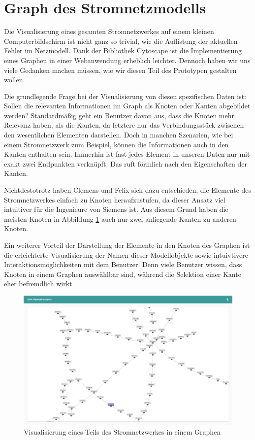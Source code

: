 \section{Graph des Stromnetzmodells}

Die Visualisierung eines gesamten Stromnetzwerkes auf einem kleinen Computerbildschirm ist nicht ganz so trivial, wie die Auflistung der aktuellen Fehler im Netzmodell. Dank der Bibliothek Cytoscape ist die Implementierung eines Graphen in einer Webanwendung erheblich leichter. Dennoch haben wir uns viele Gedanken machen müssen, wie wir diesen Teil des Prototypen gestalten wollen.

Die grundlegende Frage bei der Visualisierung von diesen spezifischen Daten ist: Sollen die relevanten Informationen im Graph als Knoten oder Kanten abgebildet werden? Standardmäßig geht ein Benutzer davon aus, dass die Knoten mehr Relevanz haben, als die Kanten, da letztere nur das Verbindungsstück zwischen den wesentlichen Elementen darstellen. Doch in manchen Szenarien, wie bei einem Stromnetzwerk zum Beispiel, können die Informationen auch in den Kanten enthalten sein. Immerhin ist fast jedes Element in unseren Daten nur mit exakt zwei Endpunkten verknüpft. Das ruft förmlich nach den Eigenschaften der Kanten.

Nichtdestotrotz haben Clemens und Felix sich dazu entschieden, die Elemente des Stromnetzwerkes einfach zu Knoten heraufzustufen, da dieser Ansatz viel intuitiver für die Ingenieure von Siemens ist. Aus diesem Grund haben die meisten Knoten in Abbildung \ref{fig:AngularGraphPrototype} auch nur zwei anliegende Kanten zu anderen Knoten. 

Ein weiterer Vorteil der Darstellung der Elemente in den Knoten des Graphen ist die erleichterte Visualisierung der Namen dieser Modellobjekte sowie intuivtivere Interaktionsmöglichkeiten mit dem Benutzer. Denn viele Benutzer wissen, dass Knoten in einem Graphen auswählbar sind, während die Selektion einer Kante eher befremdlich wirkt.

\begin{figure}
    \centering
    \includegraphics[width=1\textwidth]{content/img/Empire/Frontend/Angular_Graph_Prototype.png}
    \caption{Visualisierung eines Teils des Stromnetzwerkes in einem Graphen}
    \label{fig:AngularGraphPrototype}
\end{figure}
\FloatBarrier

